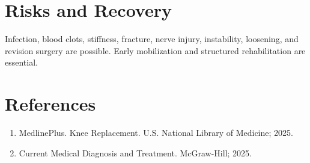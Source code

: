 \section*{Risks and Recovery}
Infection, blood clots, stiffness, fracture, nerve injury, instability, loosening, and revision surgery are possible. Early mobilization and structured rehabilitation are essential.
\section*{References}
\begin{enumerate}\item MedlinePlus. Knee Replacement. U.S. National Library of Medicine; 2025.\item Current Medical Diagnosis and Treatment. McGraw-Hill; 2025.\end{enumerate}
\clearpage
